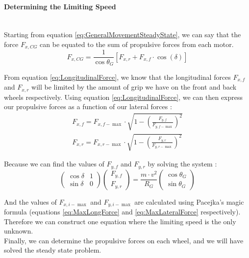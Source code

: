 \documentclass[a4paper, 11pt]{article}
\begin{document}
\paragraph{Determining the Limiting Speed} ~\\
Starting from equation \ref{eq:GeneralMovementSteadyState}, we can say that the force $F_{x,CG}$ can be equated to the sum of propulsive forces from each motor.
\begin{equation}
	F_{x,CG} = \frac{1}{\cos\theta_G}\left[F_{x,r} + F_{x,f}\cdot\cos(\delta) \right]
\end{equation}

From equation \ref{eq:LongitudinalForce}, we know that the longitudinal forces $F_{x,f}$ and $F_{x,r}$ will be limited by the amount of grip we have on the front and back wheels respectively. Using equation \ref{eq:LongitudinalForce}, we can then express our propulsive forces as a function of our lateral forces :
\begin{align}
	F_{x,f} = F_{x,f-\max}\cdot\sqrt{1-\left(\frac{F_{y,f}}{F_{y,f-\max}} \right)^2}\\
	F_{x,r} = F_{x,r-\max}\cdot\sqrt{1-\left(\frac{F_{y,r}}{F_{y,r-\max}} \right)^2}
\end{align}

Because we can find the values of $F_{y,f}$ and $F_{y,r}$ by solving the system :
\begin{equation}
	\begin{pmatrix}
		\cos\delta  & 1\\
		\sin\delta & 0
	\end{pmatrix}\begin{pmatrix}
		F_{y,f}\\
		F_{y,r}
	\end{pmatrix} = \frac{m\cdot v^2}{R_G}\begin{pmatrix}
		\cos\theta_G\\
		\sin\theta_G
	\end{pmatrix}
\end{equation}

And the values of $F_{x,i-\max}$ and $F_{y,i-\max}$ are calculated using Pacejka's magic formula (equations \ref{eq:MaxLongForce} and \ref{eq:MaxLateralForce} respectively). Therefore we can construct one equation where the limiting speed is the only unknown.\\

Finally, we can determine the propulsive forces on each wheel, and we will have solved the steady state problem.
\end{document}
